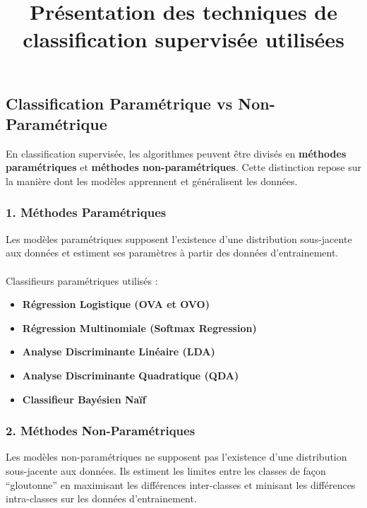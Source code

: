 \documentclass[
  letterpaper,
  DIV=11,
  numbers=noendperiod]{scrartcl}
\title{Présentation des techniques de classification supervisée
utilisées}
\author{}
\date{}
\makeatletter
\let\oldparagraph\paragraph
\renewcommand{\paragraph}{
    \@ifstar
      \xxxParagraphStar
      \xxxParagraphNoStar
  }
\newcommand{\xxxParagraphStar}[1]{\oldparagraph*{#1}\mbox{}}
\newcommand{\xxxParagraphNoStar}[1]{\oldparagraph{#1}\mbox{}}
\providecommand{\tightlist}{%
  \setlength{\itemsep}{0pt}\setlength{\parskip}{0pt}}\usepackage{longtable,booktabs,array}
\makeatother
\begin{document}
\maketitle


\subsection{Classification Paramétrique vs
Non-Paramétrique}\label{classification-paramuxe9trique-vs-non-paramuxe9trique}

En classification supervisée, les algorithmes peuvent être divisés en
\textbf{méthodes paramétriques} et \textbf{méthodes non-paramétriques}.
Cette distinction repose sur la manière dont les modèles apprennent et
généralisent les données.

\subsubsection{1. Méthodes
Paramétriques}\label{muxe9thodes-paramuxe9triques}

Les modèles paramétriques supposent l'existence d'une distribution
sous-jacente aux données et estiment ses paramètres à partir des données
d'entrainement.

\paragraph{Classifieurs paramétriques utilisés
:}\label{classifieurs-paramuxe9triques-utilisuxe9s}

\begin{itemize}
\tightlist
\item
  \textbf{Régression Logistique (OVA et OVO)}
\item
  \textbf{Régression Multinomiale (Softmax Regression)}
\item
  \textbf{Analyse Discriminante Linéaire (LDA)}
\item
  \textbf{Analyse Discriminante Quadratique (QDA)}
\item
  \textbf{Classifieur Bayésien Naïf}
\end{itemize}

\subsubsection{2. Méthodes
Non-Paramétriques}\label{muxe9thodes-non-paramuxe9triques}

Les modèles non-paramétriques ne supposent pas l'existence d'une
distribution sous-jacente aux données. Ils estiment les limites entre
les classes de façon ``gloutonne'' en maximisant les différences
inter-classes et minisant les différences intra-classes sur les données
d'entrainement.
\end{document}
